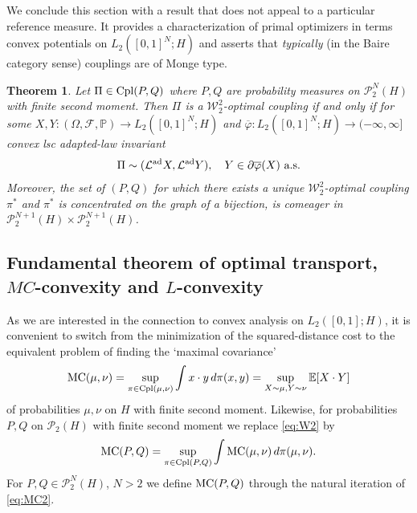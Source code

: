 \documentclass[a4paper]{amsart}
\newtheorem{theorem}{Theorem}
\numberwithin{theorem}{section}
\theoremstyle{definition}
\newcommand{\E}{\mathbb{E}}
\newcommand{\F}{\mathcal{F}}
\newcommand{\law}{\mathcal{L}}
\newcommand{\cpl}{\textup{Cpl}}
\newcommand{\W}{\mathcal{W}}
\newcommand{\Pc}{\mathcal P}
\renewcommand{\P}{\mathbb{P}}
\renewcommand{\H}{H}
\renewcommand{\phi}{\varphi}
\newcommand{\mc}{\textup{MC}}
\newcommand{\lawad}{\law^{\textup{ad}}}
\begin{document}
\medskip

We conclude this section with a result that does not appeal to a particular reference measure. It provides  a characterization of primal optimizers in terms convex potentials on $L_2([0,1]^N;H)$ and asserts that \emph{typically} (in the Baire category sense) couplings are of Monge type. 


 \begin{theorem}\label{thm:only-coupling_Brenier} 
Let $\Pi\in \cpl(P,Q)$ where  $P, Q$ are probability measures on $\Pc_2^N(H)$ with finite second moment.
Then $\Pi$ is a $\W_2^2$-optimal coupling if and only if for some $X,Y:(\Omega, \F, \P)\to L_2([0,1]^N;H)$ and  $\overline\phi:  L_2([0,1]^N; H) \to (-\infty, \infty]$ convex lsc adapted-law invariant 
\begin{align} 
\Pi \sim (\lawad X,\lawad Y), \quad Y\in \partial \overline\phi (X) \text{ a.s.} 
\end{align}
Moreover, the set of $(P,Q)$ for which there exists a unique $\W_2^2$-optimal coupling $\pi^*$ and $\pi^*$ is concentrated on the graph of a bijection, is comeager in $\Pc_2^{N+1}(H) \times \Pc_2^{N+1}(H)$.
\end{theorem}




\subsection{Fundamental theorem of optimal transport, $MC$-convexity and $L$-convexity}\label{sec:Adlift_Intro}


 As we are interested in the connection to convex analysis on $L_2([0,1]; H)$, it is convenient to switch from the minimization of the squared-distance cost to the equivalent problem of finding the `maximal covariance' 
\begin{align}\label{eq:MC1} 
\mc(\mu, \nu)=\sup_{\pi \in\cpl(\mu, \nu) } \int  x\cdot y\, d\pi(x,y) = \sup_{X\sim \mu, Y\sim \nu} \E[X \cdot Y] \end{align}
of probabilities $\mu, \nu$ on $H$ with finite second moment.
Likewise, for  probabilities $P, Q$ on $\Pc_2(H)$ with finite second moment we replace \eqref{eq:W2}   by
\begin{align}\label{eq:MC2} 
\mc(P, Q)=\sup_{\pi \in\cpl(P, Q) } \int \mc(\mu, \nu) \, d\pi(\mu,\nu). 
\end{align}
For $P,Q\in \Pc_2^N(\H)$, $N>2$ we define  $\mc(P, Q)$ through the natural iteration of \eqref{eq:MC2}.
\end{document}
